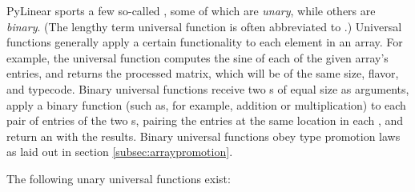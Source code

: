 PyLinear sports a few so-called ,
 some of which are \emph{unary},
while others are \emph{binary}. (The lengthy term universal function is
often abbreviated to .) Universal functions
generally apply a certain functionality to each element in an
array. For example, the  universal function computes the
sine of each of the given array's entries, and returns the processed
matrix, which will be of the same size, flavor, and typecode. Binary
universal functions receive two s of equal size as
arguments, apply a binary function (such as, for example, addition or
multiplication) to each pair of entries of the two s,
pairing the entries at the same location in each , and
return an  with the results. Binary universal functions
obey type promotion laws as laid out in section
\ref{subsec:arraypromotion}.

The following unary universal functions exist:

